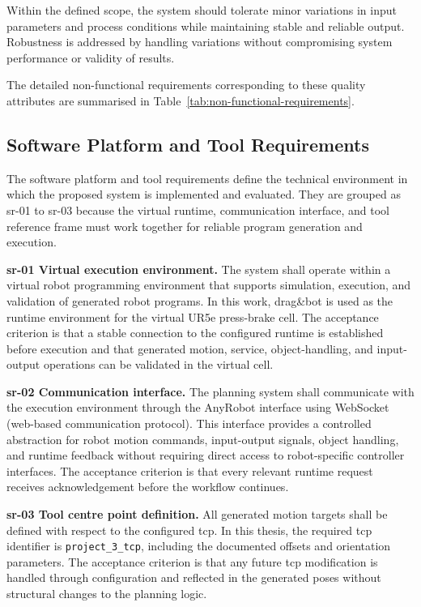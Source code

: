 Within the defined scope, the system should tolerate minor variations in input parameters and process conditions while maintaining stable and reliable output. Robustness is addressed by handling variations without compromising system performance or validity of results.

The detailed non-functional requirements corresponding to these quality attributes are summarised in Table~\ref{tab:non-functional-requirements}.



\subsection{Software Platform and Tool Requirements}
\label{sec:software-platform-tool-requirements}

The software platform and tool requirements define the technical environment in which the proposed system is implemented and evaluated. They are grouped as \acs{sr}-01 to \acs{sr}-03 because the virtual runtime, communication interface, and tool reference frame must work together for reliable program generation and execution.

\label{subsubsec:sr-01-virtual-execution-environment}
\noindent\textbf{\acs{sr}-01 Virtual execution environment.}
The system shall operate within a virtual robot programming environment that supports simulation, execution, and validation of generated robot programs. In this work, drag\&bot is used as the runtime environment for the virtual UR5e press-brake cell. The acceptance criterion is that a stable connection to the configured runtime is established before execution and that generated motion, service, object-handling, and input-output operations can be validated in the virtual cell.

\label{subsubsec:sr-02-communication-interface-requirement}
\noindent\textbf{\acs{sr}-02 Communication interface.}
The planning system shall communicate with the execution environment through the AnyRobot interface using WebSocket (web-based communication protocol). This interface provides a controlled abstraction for robot motion commands, input-output signals, object handling, and runtime feedback without requiring direct access to robot-specific controller interfaces. The acceptance criterion is that every relevant runtime request receives acknowledgement before the workflow continues.

\label{subsubsec:sr-03-tool-centre-point-definition-requirement}
\noindent\textbf{\acs{sr}-03 Tool centre point definition.}
All generated motion targets shall be defined with respect to the configured \ac{tcp}. In this thesis, the required \ac{tcp} identifier is \texttt{project\_3\_tcp}, including the documented offsets and orientation parameters. The acceptance criterion is that any future \ac{tcp} modification is handled through configuration and reflected in the generated poses without structural changes to the planning logic.

